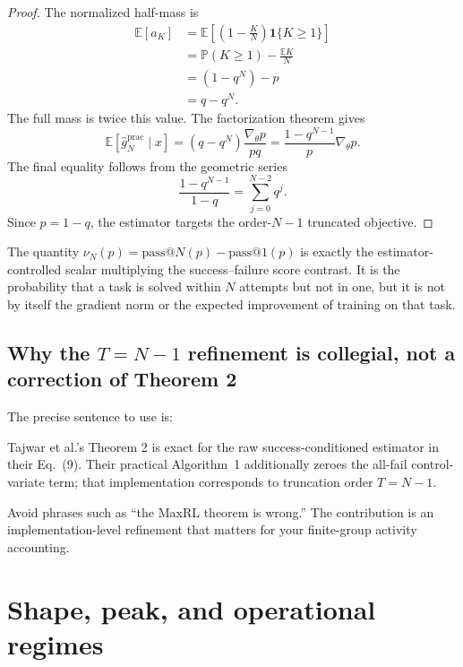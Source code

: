 \documentclass[11pt]{article}
\makeatletter
\newcommand{\E}{\mathbb{E}}
\newcommand{\Prb}{\mathbb{P}}
\newcommand{\ind}{\mathbf{1}}
\newcommand{\grad}{\nabla_{\!\theta}}
\newcommand{\PassAt}[1]{\mathrm{pass@}#1}
\theoremstyle{definition}
\theoremstyle{remark}
\makeatother
\begin{document}
\begin{proof}
The normalized half-mass is
\begin{align*}
\E[a_K]
&=\E\left[\left(1-\frac{K}{N}\right)\ind\{K\ge1\}\right]\\
&=\Prb(K\ge1)-\frac{\E K}{N}\\
&=(1-q^N)-p\\
&=q-q^N.
\end{align*}
The full mass is twice this value. The factorization theorem gives
\[
\E[\widehat g_N^{\mathrm{prac}}\mid x]
=(q-q^N)\frac{\grad p}{pq}
=\frac{1-q^{N-1}}{p}\grad p.
\]
The final equality follows from the geometric series
\[
\frac{1-q^{N-1}}{1-q}=\sum_{j=0}^{N-2}q^j.
\]
Since $p=1-q$, the estimator targets the order-$N-1$ truncated objective.
\end{proof}

\begin{rewritebox}[title={\textbf{Recommended theorem interpretation}}]
The quantity $\nu_N(p)=\PassAt{N}(p)-\PassAt{1}(p)$ is exactly the estimator-controlled scalar multiplying the success--failure score contrast. It is the probability that a task is solved within $N$ attempts but not in one, but it is not by itself the gradient norm or the expected improvement of training on that task.
\end{rewritebox}

\subsection{Why the $T=N-1$ refinement is collegial, not a correction of Theorem 2}

The precise sentence to use is:

\begin{rewritebox}
Tajwar et al.'s Theorem 2 is exact for the raw success-conditioned estimator in their Eq.~(9). Their practical Algorithm~1 additionally zeroes the all-fail control-variate term; that implementation corresponds to truncation order $T=N-1$.
\end{rewritebox}

Avoid phrases such as ``the MaxRL theorem is wrong.'' The contribution is an implementation-level refinement that matters for your finite-group activity accounting.

\section{Shape, peak, and operational regimes}
\end{document}
